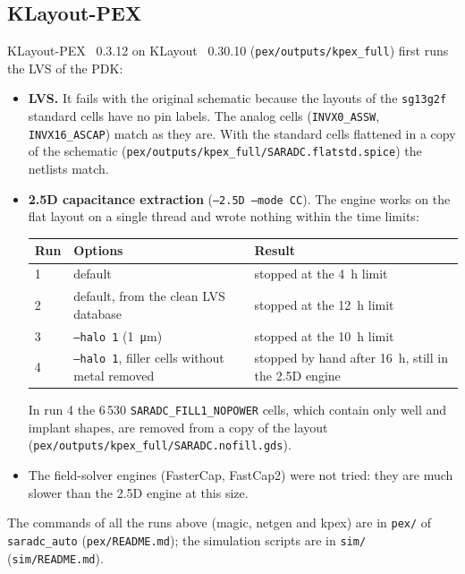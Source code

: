 \documentclass[10pt,a4paper]{article}
\begin{document}
\subsection{KLayout-PEX}
KLayout-PEX~\cite{kpex} 0.3.12 on KLayout~\cite{klayout} 0.30.10 (\texttt{pex/outputs/kpex\_full}) first runs the
LVS of the PDK:
\begin{itemize}
  \item \textbf{LVS.} It fails with the original schematic because the layouts of the
        \texttt{sg13g2f} standard cells have no pin labels. The analog cells (\texttt{INVX0\_ASSW},
        \texttt{INVX16\_ASCAP}) match as they are. With the standard cells flattened in a copy of the
        schematic (\texttt{pex/outputs/kpex\_full/SARADC.flatstd.spice}) the netlists match.
  \item \textbf{2.5D capacitance extraction} (\texttt{--2.5D --mode CC}). The engine works on the
        flat layout on a single thread and wrote nothing within the time limits:
        \begin{center}\small
        \begin{tabular}{lll}
        \toprule
        Run & Options & Result \\
        \midrule
        1 & default & stopped at the \SI{4}{h} limit \\
        2 & default, from the clean LVS database & stopped at the \SI{12}{h} limit \\
        3 & \texttt{--halo 1} (\SI{1}{\micro m}) & stopped at the \SI{10}{h} limit \\
        4 & \texttt{--halo 1}, filler cells without metal removed & stopped by hand after \SI{16}{h}, still in the 2.5D engine \\
        \bottomrule
        \end{tabular}
        \end{center}
        In run 4 the 6\,530 \texttt{SARADC\_FILL1\_NOPOWER} cells, which contain only well and implant
        shapes, are removed from a copy of the layout (\texttt{pex/outputs/kpex\_full/SARADC.nofill.gds}).
  \item The field-solver engines (FasterCap, FastCap2) were not tried: they are much slower than the
        2.5D engine at this size.
\end{itemize}
The commands of all the runs above (magic, netgen and kpex) are in \texttt{pex/} of
\texttt{saradc\_auto} (\texttt{pex/README.md}); the simulation scripts are in \texttt{sim/}
(\texttt{sim/README.md}).
\end{document}
